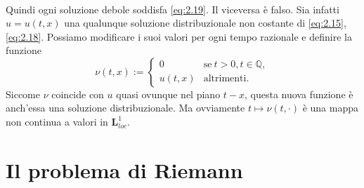 \begin{osservazione}
\begin{align*}
    \end{align*}
    Quindi ogni soluzione debole soddisfa \eqref{eq:2.19}.
    Il viceversa è falso. Sia infatti $u=u(t,x)$ una qualunque soluzione distribuzionale non costante di \eqref{eq:2.15}, \eqref{eq:2.18}. Possiamo modificare i suoi valori per ogni tempo razionale e definire la funzione
    \begin{equation*}
    \nu(t,x):=
        \begin{cases}
            0 & \text{se} \ t>0, t\in\mathbb{Q},\\
            u(t,x) & \text{altrimenti}.
        \end{cases}
    \end{equation*}
    Siccome $\nu$ coincide con $u$ quasi ovunque nel piano $t-x$, questa nuova funzione è anch'essa una soluzione distribuzionale. Ma ovviamente $t\mapsto\nu(t,\cdot)$ è una mappa non continua a valori in $\mathbf{L}^{1}_{loc}$.
\end{osservazione}

\section{Il problema di Riemann}

